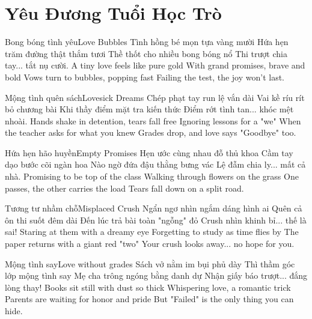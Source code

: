 \chapter{Yêu Đương Tuổi Học Trò}

\begin{tutuyetbox}{Bong bóng tình yêu}{Love Bubbles}
Tình hồng bé mọn tựa vàng mười
Hứa hẹn trăm đường thật thắm tươi
Thề thốt cho nhiều bong bóng nổ
Thi trượt chia tay... tắt nụ cười.
\tcblower
A tiny love feels like pure gold
With grand promises, brave and bold
Vows turn to bubbles, popping fast
Failing the test, the joy won't last.
\end{tutuyetbox}

\begin{tutuyetbox}{Mộng tình quên sách}{Lovesick Dreams}
Chép phạt tay run lệ vắn dài
Vai kề ríu rít bỏ chương bài
Khi thầy điểm mặt tra kiến thức
Điểm rớt tình tan... khóc mệt nhoài.
\tcblower
Hands shake in detention, tears fall free
Ignoring lessons for a "we" 
When the teacher asks for what you knew
Grades drop, and love says "Goodbye" too.
\end{tutuyetbox}

\begin{tutuyetbox}{Hứa hẹn hão huyền}{Empty Promises}
Hẹn ước cùng nhau đỗ thủ khoa
Cầm tay dạo bước cõi ngàn hoa
Nào ngờ đứa đậu thằng bưng vác
Lệ đẫm chia ly... mất cả nhà.
\tcblower
Promising to be top of the class
Walking through flowers on the grass
One passes, the other carries the load
Tears fall down on a split road.
\end{tutuyetbox}

\begin{tutuyetbox}{Tương tư nhầm chỗ}{Misplaced Crush}
Ngẩn ngơ nhìn ngắm dáng hình ai
Quên cả ôn thi suốt đêm dài
Đến lúc trả bài toàn "ngỗng" đỏ
Crush nhìn khinh bỉ... thế là sai!
\tcblower
Staring at them with a dreamy eye
Forgetting to study as time flies by
The paper returns with a giant red "two"
Your crush looks away... no hope for you.
\end{tutuyetbox}

\begin{tutuyetbox}{Mộng tình say}{Love without grades}
Sách vở nằm im bụi phủ dày
Thì thầm góc lớp mộng tình say
Mẹ cha trông ngóng bằng danh dự
Nhận giấy báo trượt... đắng lòng thay!
\tcblower
Books sit still with dust so thick
Whispering love, a romantic trick
Parents are waiting for honor and pride
But "Failed" is the only thing you can hide.
\end{tutuyetbox}

